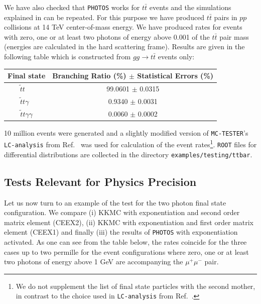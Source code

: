 \documentclass[]{Photos_interface_design}
\begin{document}
We have also checked that {\tt PHOTOS} works for $t \bar t$ events and the simulations explained in \cite{RichterWas:1993ta} can be repeated.
For this purpose we have produced $t \bar t$ pairs in $pp$ collisions at 
14 TeV center-of-mass energy. We have produced rates for events with zero, one or
at least two photons of energy above 0.001 of the $t \bar t$ pair mass
(energies are calculated in  the hard scattering frame).
Results are given in the following table which is constructed from  
$gg \to t \bar t$ events only:


\vspace{0.3cm} 
\begin{center}
{ \begin{tabular}{c c} 
\toprule 
Final state &  Branching Ratio (\%) $\pm$ Statistical Errors (\%) \\  
\midrule
{$ \widetilde{t} t \; \;\; \;$}  &  {99.0601 $\pm$ 0.0315}  \\ 
 {$  \widetilde{t} t \gamma \;\;$} &   { 0.9340 $\pm$  0.0031}   \\ 
{$  \widetilde{t} t \gamma \gamma$}  &  { 0.0060 $\pm$  0.0002}  \\ 
\bottomrule
\end{tabular} 
}  
\end{center} 

10 million events were generated and a slightly modified 
version of {\tt MC-TESTER}'s {\tt LC-analysis} from Ref.~\cite{Golonka:2002rz}
was used for calculation of the event rates\footnote{  We do not supplement the list of 
final state particles with the second mother, in contrast to the choice used in {\tt LC-analysis} from  Ref.~\cite{Golonka:2002rz}. }.
{\tt ROOT} files for differential distributions are 
collected in the directory {\tt examples/testing/ttbar}. 

\subsection{Tests Relevant for Physics Precision}


Let us now turn to an example of the test for the two photon final state configuration.
We compare (i) KKMC \cite{kkcpc:1999} with exponentiation and second order matrix element (CEEX2), (ii) KKMC with exponentiation and first order matrix element (CEEX1)
and finally (iii) the results of {\tt PHOTOS} with exponentiation activated. As one can see from the table below, the rates 
coincide for the three cases up to two permille for the event configurations 
where zero, one or at least two photons of energy above 1 GeV are accompanying the $\mu^+\mu^-$ pair.
\end{document}
